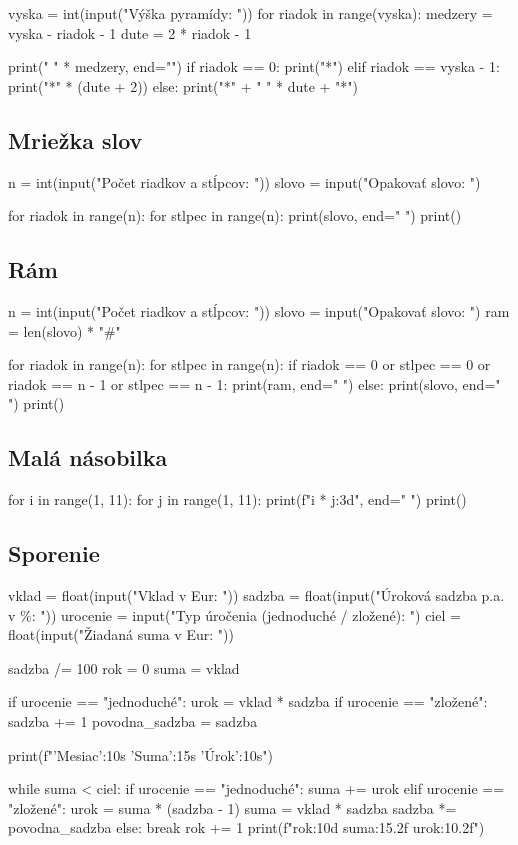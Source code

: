 \begin{solution}
vyska = int(input("Výška pyramídy: "))
for riadok in range(vyska):
    medzery = vyska - riadok - 1
    dute = 2 * riadok - 1

    print(" " * medzery, end="")
    if riadok == 0:
        print("*")
    elif riadok == vyska - 1:
        print("*" * (dute + 2))
    else:
        print("*" + " " * dute + "*")
\end{solution}

\subsection{Mriežka slov}
\begin{solution}
n = int(input("Počet riadkov a stĺpcov: "))
slovo = input("Opakovať slovo: ")

for riadok in range(n):
    for stlpec in range(n):
        print(slovo, end=" ")
    print()
\end{solution}

\subsection{Rám}
\begin{solution}
n = int(input("Počet riadkov a stĺpcov: "))
slovo = input("Opakovať slovo: ")
ram = len(slovo) * "#"

for riadok in range(n):
    for stlpec in range(n):
        if riadok == 0 or stlpec == 0 or riadok == n - 1 or stlpec == n - 1:
            print(ram, end=" ")
        else:
            print(slovo, end=" ")
    print()
\end{solution}

\subsection{Malá násobilka}
\begin{solution}
for i in range(1, 11):
    for j in range(1, 11):
        print(f"{i * j:3d}", end=" ")
    print()
\end{solution}

\subsection{Sporenie}
\begin{solution}
vklad = float(input("Vklad v Eur: "))
sadzba = float(input("Úroková sadzba p.a. v \%: "))
urocenie = input("Typ úročenia (jednoduché / zložené): ")
ciel = float(input("Žiadaná suma v Eur: "))

sadzba /= 100
rok = 0
suma = vklad

if urocenie == "jednoduché":
    urok = vklad * sadzba
if urocenie == "zložené":
    sadzba += 1
    povodna_sadzba = sadzba

print(f"{'Mesiac':10s} {'Suma':15s} {'Úrok':10s}")

while suma < ciel:
    if urocenie == "jednoduché":
        suma += urok
    elif urocenie == "zložené":
        urok = suma * (sadzba - 1)
        suma = vklad * sadzba
        sadzba *= povodna_sadzba
    else:
        break
    rok += 1
    print(f"{rok:10d} {suma:15.2f} {urok:10.2f}")
\end{solution}
